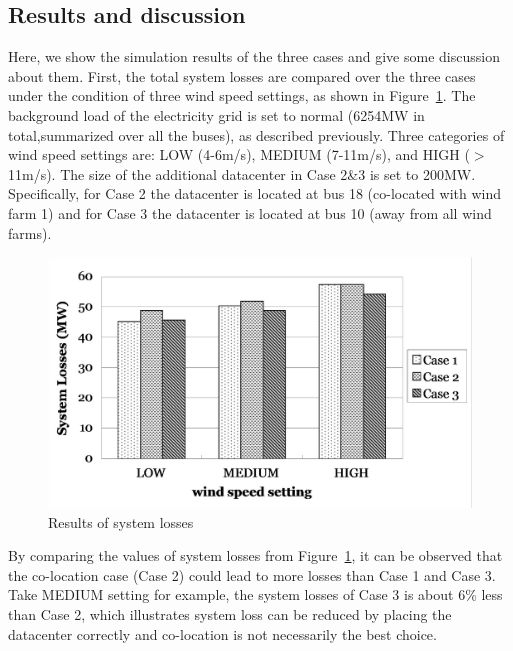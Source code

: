 \subsection{Results and discussion}

Here, we show the simulation results of the three cases and give some discussion about them. First, the total system losses are compared over the three cases under the condition of three wind speed settings, as shown in Figure~\ref{fig:loss-cases}. The background load of the electricity grid is set to normal (6254MW in total,summarized over all the buses), as described previously. Three categories of wind speed settings are: LOW (4-6m/s), MEDIUM (7-11m/s), and HIGH ($>$11m/s). The size of the additional datacenter in Case 2\&3 is set to 200MW. Specifically, for Case 2 the datacenter is located at bus 18 (co-located with wind farm 1) and for Case 3 the datacenter is located at bus 10 (away from all wind farms).

\begin{figure}[ht]
\centering
\includegraphics[width=1\columnwidth]{img/loss3cases.pdf}
\caption{Results of system losses}
\label{fig:loss-cases}
\end{figure}

By comparing the values of system losses from Figure~\ref{fig:loss-cases}, it can be observed that the co-location case (Case 2) could lead to more losses than Case 1 and Case 3. Take MEDIUM setting for example, the system losses of Case 3 is about 6\% less than Case 2, which illustrates system loss can be reduced by placing the datacenter correctly and co-location is not necessarily the best choice.


